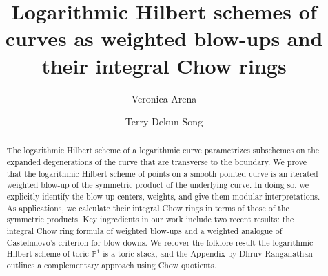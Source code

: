 \documentclass[10.5pt]{amsart}
\theoremstyle{definition}
\theoremstyle{definition}
\theoremstyle{definition}
\theoremstyle{definition}
\newcommand{\PP}{\mathbb{P}}
\begin{document}
\title{Logarithmic Hilbert schemes of curves as weighted blow-ups and their integral Chow rings}

\author[V. Arena]{Veronica Arena}\address{Department of Pure Mathematics and Mathematical Statistics, University of Cambridge, Cambridge, CB3 0WA}
\author[T. Song]{Terry Dekun Song}\address{Department of Pure Mathematics and Mathematical Statistics, University of Cambridge, Cambridge, CB3 0WA}


\begin{abstract}
    The logarithmic Hilbert scheme of a logarithmic curve parametrizes subschemes on the expanded degenerations of the curve that are transverse to the boundary. We prove that the logarithmic Hilbert scheme of points on a smooth pointed curve is an iterated weighted blow-up of the symmetric product of the underlying curve. In doing so, we explicitly identify the blow-up centers, weights, and give them modular interpretations. As applications, we calculate their integral Chow rings in terms of those of the symmetric products. Key ingredients in our work include two recent results: the integral Chow ring formula of weighted blow-ups and a weighted analogue of Castelnuovo's criterion for blow-downs. We recover the folklore result the logarithmic Hilbert scheme of toric $\PP^1$ is a toric stack, and the Appendix by Dhruv Ranganathan outlines a complementary approach using Chow quotients.
\end{abstract}
\maketitle
\setcounter{tocdepth}{1}
\tableofcontents
\end{document}
